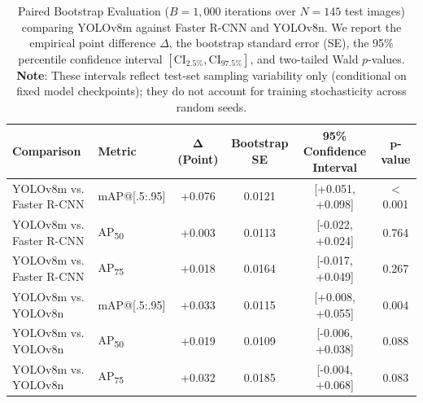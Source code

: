 \begin{table}[htbp]
\centering
\caption{Paired Bootstrap Evaluation ($B=1{,}000$ iterations over $N=145$ test images) comparing YOLOv8m against Faster R-CNN and YOLOv8n. We report the empirical point difference $\Delta$, the bootstrap standard error (SE), the 95\% percentile confidence interval $[\text{CI}_{2.5\%}, \text{CI}_{97.5\%}]$, and two-tailed Wald $p$-values. \textbf{Note}: These intervals reflect test-set sampling variability only (conditional on fixed model checkpoints); they do not account for training stochasticity across random seeds.}
\label{tab:bootstrap_ci}
\small
\renewcommand{\arraystretch}{1.2}
\begin{tabular}{llcccc}
\toprule
\textbf{Comparison} & \textbf{Metric} & $\bm{\Delta}$ \textbf{(Point)} & \textbf{Bootstrap SE} & \textbf{95\% Confidence Interval} & $\bm{p}$\textbf{-value} \\
\midrule
YOLOv8m vs. Faster R-CNN & mAP@[.5:.95] & +0.076 & 0.0121 & [+0.051, +0.098] & < 0.001 \\
YOLOv8m vs. Faster R-CNN & AP\textsubscript{50} & +0.003 & 0.0113 & [-0.022, +0.024] & 0.764 \\
YOLOv8m vs. Faster R-CNN & AP\textsubscript{75} & +0.018 & 0.0164 & [-0.017, +0.049] & 0.267 \\
\midrule
YOLOv8m vs. YOLOv8n & mAP@[.5:.95] & +0.033 & 0.0115 & [+0.008, +0.055] & 0.004 \\
YOLOv8m vs. YOLOv8n & AP\textsubscript{50} & +0.019 & 0.0109 & [-0.006, +0.038] & 0.088 \\
YOLOv8m vs. YOLOv8n & AP\textsubscript{75} & +0.032 & 0.0185 & [-0.004, +0.068] & 0.083 \\
\bottomrule
\end{tabular}
\end{table}
